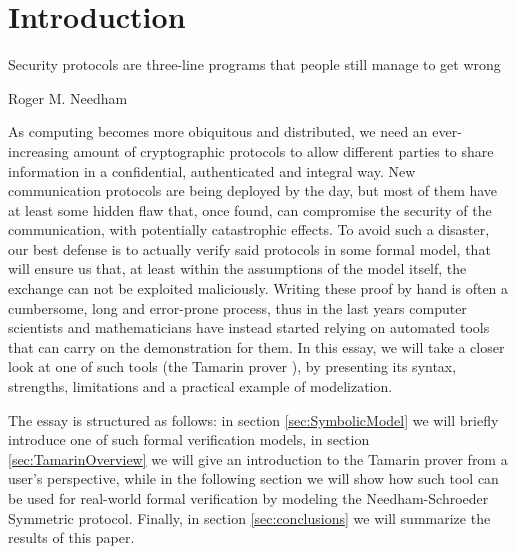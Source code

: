 \documentclass[fleqn,10pt]{SelfArx} %
\affiliation{\textsuperscript{1}\textit{Student number 147681}, \lstinline|dambrosi.denis@spes.uniud.it|} %
\begin{document}
\maketitle %

\tableofcontents %

\thispagestyle{empty} %


\section*{Introduction} %


\epigraph{Security protocols are three-line programs that people still manage to get wrong}{Roger M. Needham}

As computing becomes more obiquitous and distributed, we need an ever-increasing amount of cryptographic protocols to allow different parties to share information in a confidential, authenticated and integral way. New communication protocols are being deployed by the day, but most of them have at least some hidden flaw that, once found, can compromise the security of the communication, with potentially catastrophic effects. To avoid such a disaster, our best defense is to actually verify said protocols in some formal model, that will ensure us that, at least within the assumptions of the model itself, the exchange can not be exploited maliciously. Writing these proof by hand is often a cumbersome, long and error-prone process, thus in the last years computer scientists and mathematicians have instead started relying on automated tools that can carry on the demonstration for them. In this essay, we will take a closer look at one of such tools (the Tamarin prover \cite{tamarin}), by presenting its syntax, strengths, limitations and a practical example of modelization.

The essay is structured as follows: in section \ref{sec:SymbolicModel} we will briefly introduce one of such formal verification models, in section \ref{sec:TamarinOverview} we will give an introduction to the Tamarin prover from a user's perspective, while in the following section we will show how such tool can be used for real-world formal verification by modeling the Needham-Schroeder Symmetric protocol. Finally, in section \ref{sec:conclusions} we will summarize the results of this paper.
\end{document}
